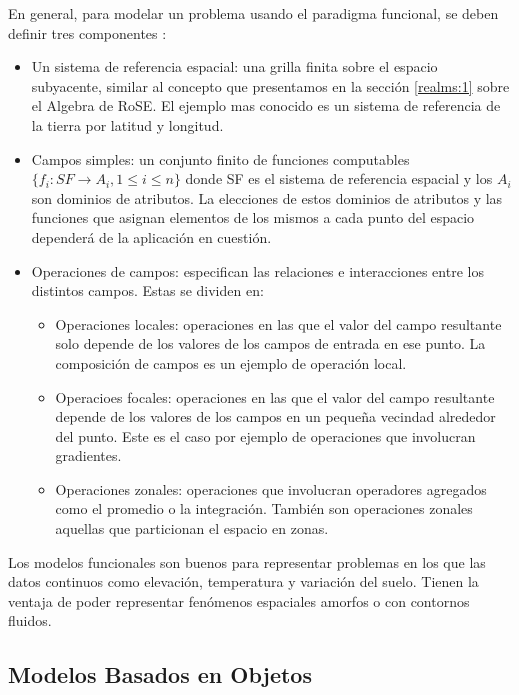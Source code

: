 En general, para modelar un problema usando el paradigma funcional, se deben definir tres componentes \cite{worboyz}:
\begin{itemize}
    \item Un sistema de referencia espacial: una grilla finita sobre el espacio subyacente,
    similar al concepto que presentamos en la sección \ref{realms:1} sobre el Algebra de RoSE.
    El ejemplo mas conocido es un sistema de referencia de la tierra por latitud y longitud.
    \item Campos simples: un conjunto finito de funciones computables $\{f_i: SF \rightarrow A_i, 1 \le i \le n\}$
    donde SF es el sistema de referencia espacial y los $A_i$ son dominios de atributos. La elecciones de estos dominios de atributos
    y las funciones que asignan elementos de los mismos a cada punto del espacio dependerá de la aplicación en cuestión.
    \item Operaciones de campos: especifican las relaciones e interacciones entre los distintos campos. Estas se dividen en:
    \begin{itemize}
        \item Operaciones locales: operaciones en las que el valor del campo resultante solo depende de los valores de los campos de entrada en ese punto.
        La composición de campos es un ejemplo de operación local.
        \item Operacioes focales: operaciones en las que el valor del campo resultante depende de los valores de los campos en un pequeña vecindad alrededor del punto.
        Este es el caso por ejemplo de operaciones que involucran gradientes.
        \item Operaciones zonales: operaciones que involucran operadores agregados como el promedio o la integración. También son operaciones
        zonales aquellas que particionan el espacio en zonas.
    \end{itemize}
\end{itemize}

Los modelos funcionales son buenos para representar problemas en los que las datos continuos
como elevación, temperatura y variación del suelo.
Tienen la ventaja de poder representar fenómenos espaciales amorfos o con contornos fluidos.

\subsection{Modelos Basados en Objetos} \label{subsec:mbo}

